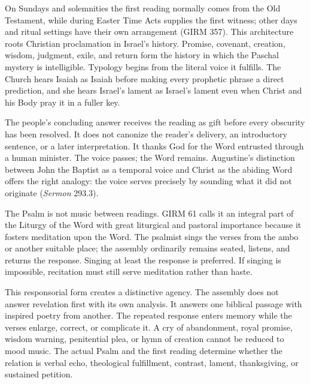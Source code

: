 On Sundays and solemnities the first reading normally comes from the Old Testament, while during Easter Time Acts supplies the first witness; other days and ritual settings have their own arrangement (GIRM 357). This architecture roots Christian proclamation in Israel's history. Promise, covenant, creation, wisdom, judgment, exile, and return form the history in which the Paschal mystery is intelligible. Typology begins from the literal voice it fulfills. The Church hears Isaiah as Isaiah before making every prophetic phrase a direct prediction, and she hears Israel's lament as Israel's lament even when Christ and his Body pray it in a fuller key.

The people's concluding answer receives the reading as gift before every obscurity has been resolved. It does not canonize the reader's delivery, an introductory sentence, or a later interpretation. It thanks God for the Word entrusted through a human minister. The voice passes; the Word remains. Augustine's distinction between John the Baptist as a temporal voice and Christ as the abiding Word offers the right analogy: the voice serves precisely by sounding what it did not originate (\emph{Sermon} 293.3).


The Psalm is not music between readings. GIRM 61 calls it an integral part of the Liturgy of the Word with great liturgical and pastoral importance because it fosters meditation upon the Word. The psalmist sings the verses from the ambo or another suitable place; the assembly ordinarily remains seated, listens, and returns the response. Singing at least the response is preferred. If singing is impossible, recitation must still serve meditation rather than haste.

This responsorial form creates a distinctive agency. The assembly does not answer revelation first with its own analysis. It answers one biblical passage with inspired poetry from another. The repeated response enters memory while the verses enlarge, correct, or complicate it. A cry of abandonment, royal promise, wisdom warning, penitential plea, or hymn of creation cannot be reduced to mood music. The actual Psalm and the first reading determine whether the relation is verbal echo, theological fulfillment, contrast, lament, thanksgiving, or sustained petition.

